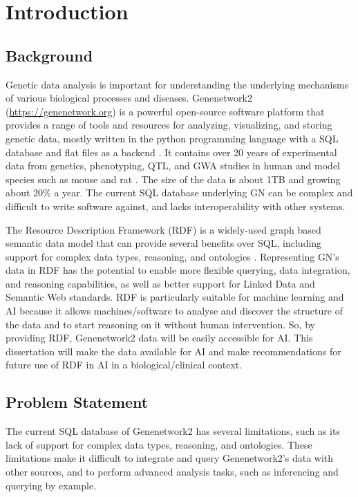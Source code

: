 \chapter{Introduction}

\section{Background}
Genetic data analysis is important for understanding the underlying mechanisms of various biological processes and diseases.  Genenetwork2 (\url{https://genenetwork.org}) is a powerful open-source software platform that provides a range of tools and resources for analyzing, visualizing, and storing genetic data, mostly written in the python programming language with a SQL database and flat files as a backend \citetext{\citealp{sloan2016genenetwork}; \citealp*{mulligan2017genenetwork}}.  It contains over 20 years of experimental data from genetics, phenotyping, QTL, and GWA studies in human and model species such as mouse and rat \citep{sloan2016genenetwork}.  The size of the data is about 1TB and growing about 20\% a year. The current SQL database underlying GN can be complex and difficult to write software against, and lacks interoperability with other systems.

The Resource Description Framework (RDF) is a widely-used graph based semantic data model that can provide several benefits over SQL, including support for complex data types, reasoning, and ontologies \citep*{candan2001resource,allemang2011semantic}.  Representing GN's data in RDF has the potential to enable more flexible querying, data integration, and reasoning capabilities, as well as better support for Linked Data and Semantic Web standards. RDF is particularly suitable for machine learning and AI because it allows machines/software to analyse and discover the structure of the data and to start reasoning on it without human intervention. So, by providing RDF, Genenetwork2 data will be easily accessible for AI. This dissertation will make the data available for AI and make recommendations for future use of RDF in AI in a biological/clinical context.

\clearpage
\section{Problem Statement}

The current SQL database of Genenetwork2 has several limitations, such as its lack of support for complex data types, reasoning, and ontologies.  These limitations make it difficult to integrate and query Genenetwork2's data with other sources, and to perform advanced analysis tasks, such as inferencing and querying by example.

